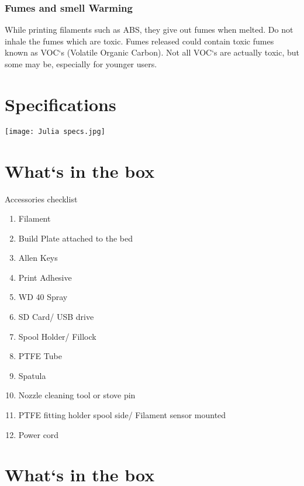 \documentclass{article}
\begin{document}
\subsubsection{\textbf{Fumes and smell Warming}}
While printing filaments such as ABS, they give out fumes when melted. Do not inhale the fumes which are toxic. Fumes released could contain toxic fumes known as VOC`s (Volatile Organic Carbon). Not all VOC`s are actually toxic, but some may be, especially for younger users.
\cleardoublepage
 
\section{Specifications}\label{sec:Specifications}
\texttt{[image: Julia specs.jpg]}
\cleardoublepage


\section{What`s in the box}\label{sec:What`s in the box}

Accessories checklist
\begin{enumerate}
    \item Filament
    \item Build Plate attached to the bed
    \item Allen Keys
    \item Print Adhesive
    \item WD 40 Spray
    \item SD Card/ USB drive
    \item Spool Holder/ Fillock
    \item PTFE Tube
    \item Spatula
    \item Nozzle cleaning tool or stove pin
    \item PTFE fitting holder spool side/ Filament sensor mounted
    \item Power cord
    
\end{enumerate}


\section{What`s in the box}\label{sec:What`s in the box}
\end{document}
